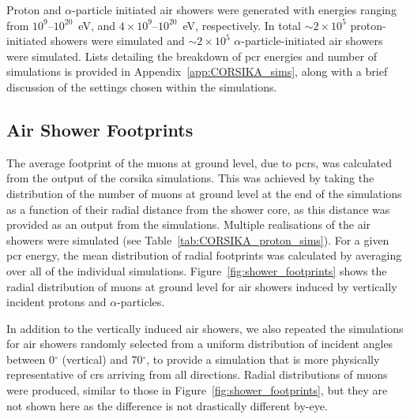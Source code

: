 Proton and $\alpha$-particle initiated air showers were generated with energies ranging from $10^{9}$--$10^{20}$~eV, and $4\times10^{9}$--$10^{20}$~eV, respectively. In total $\sim 2\times10^5$ proton-initiated showers were simulated and $\sim 2\times10^5$ $\alpha$-particle-initiated air showers were simulated. Lists detailing the breakdown of \gls{pcr} energies and number of simulations is provided in Appendix~\ref{app:CORSIKA_sims}, along with a brief discussion of the settings chosen within the simulations.


\subsection{Air Shower Footprints}\label{sec:CORSIKA_footprint}

The average footprint of the muons at ground level, due to \glspl{pcr}, was calculated from the output of the \gls{corsika} simulations. This was achieved by taking the distribution of the number of muons at ground level at the end of the simulations as a function of their radial distance from the shower core, as this distance was provided as an output from the simulations. Multiple realisations of the air showers were simulated (see Table~\ref{tab:CORSIKA_proton_sims}). For a given \gls{pcr} energy, the mean distribution of radial footprints was calculated by averaging over all of the individual simulations. Figure~\ref{fig:shower_footprints} shows the radial distribution of muons at ground level for air showers induced by vertically incident protons and $\alpha$-particles.

In addition to the vertically induced air showers, we also repeated the simulations for air showers randomly selected from a uniform distribution of incident angles between 0$^\circ$ (vertical) and 70$^\circ$, to provide a simulation that is more physically representative of \glspl{cr} arriving from all directions. Radial distributions of muons were produced, similar to those in Figure~\ref{fig:shower_footprints}, but they are not shown here as the difference is not drastically different by-eye.


